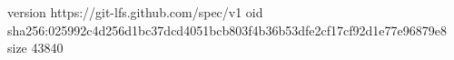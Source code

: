 version https://git-lfs.github.com/spec/v1
oid sha256:025992c4d256d1bc37dcd4051bcb803f4b36b53dfe2cf17cf92d1e77e96879e8
size 43840
